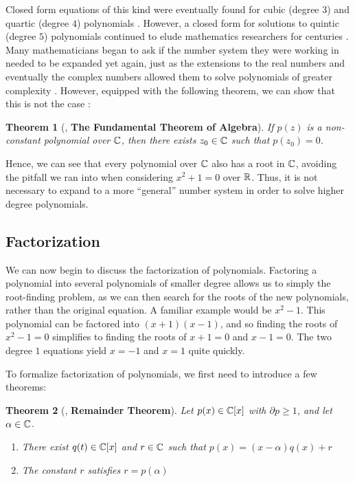 \documentclass[11pt, a4paper, oneside]{article}
\theoremstyle{plain}
\newtheorem*{thm*}{Theorem}
\theoremstyle{plain}
\theoremstyle{plain}
\theoremstyle{plain}
\theoremstyle{definition}
\theoremstyle{example}
\begin{document}
Closed form equations of this kind were eventually found for cubic (degree $3$) and quartic (degree $4$) polynomials \cite[\S 1.4, p. 25-29]{stewart}. However, a closed form for solutions to quintic (degree $5$) polynomials continued to elude mathematics researchers for centuries \cite[\S 1.4, p. 31]{stewart}. Many mathematicians began to ask if the number system they were working in needed to be expanded yet again, just as the extensions to the real numbers and eventually the complex numbers allowed them to solve polynomials of greater complexity \cite[\S 2.2, p. 39]{stewart}. However, equipped with the following theorem, we can show that this is not the case \cite[\S 2.2, p. 41]{stewart}:

\begin{thm*}[{\cite[Thm.\ 2.4]{stewart}}, \textbf{The Fundamental Theorem of Algebra}] 
If $p(z)$ is a non-constant polynomial over $\mathbb{C}$, then there exists $z_0 \in \mathbb{C}$ such that $p(z_0) = 0$.
\end{thm*}

Hence, we can see that every polynomial over $\mathbb{C}$ also has a root in $\mathbb{C}$, avoiding the pitfall we ran into when considering $x^2 + 1 = 0$ over $\mathbb{R}$. Thus, it is not necessary to expand to a more ``general'' number system in order to solve higher degree polynomials.

\subsection{Factorization}

We can now begin to discuss the factorization of polynomials. Factoring a polynomial into several polynomials of smaller degree allows us to simply the root-finding problem, as we can then search for the roots of the new polynomials, rather than the original equation. A familiar example would be $x^2 - 1$. This polynomial can be factored into $(x+1)(x-1)$, and so finding the roots of $x^2 - 1 = 0$ simplifies to finding the roots of $x+1 = 0$ and $x - 1 = 0$. The two degree $1$ equations yield $x = -1$ and $x = 1$ quite quickly.

\par
To formalize factorization of polynomials, we first need to introduce a few theorems:

\begin{thm*}[{\cite[Thm.\ 2.5]{stewart}}, \textbf{Remainder Theorem}] 
Let $p(x) \in \mathbb{C}[x]$ with $\partial p \geq 1$, and let $\alpha \in \mathbb{C}$.
\begin{enumerate}
\item There exist $q(t) \in \mathbb{C}[x]$ and $r \in \mathbb{C}$ such that $p(x) = (x - \alpha)q(x) + r$
\item The constant $r$ satisfies $r = p(\alpha)$
\end{enumerate}
\end{thm*}
\end{document}
